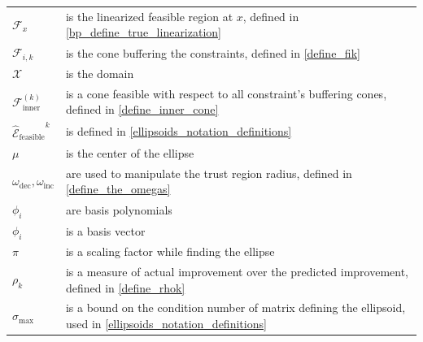 \documentclass{article}
\theoremstyle{case}
\numberwithin{theorem}{subsection}
\newcommand{\domain}{{\mathcal X}}
\newcommand{\fcki}{{\mathcal {F}^{(k)}_{\textrm{inner}}}}
\newcommand{\fik}{{\mathcal F_{i, k}}}
\newcommand{\omegadec}{\omega_{\text{dec}}}
\newcommand{\omegainc}{\omega_{\text{inc}}}
\newcommand{\rk}{\rho_k}
\newcommand{\scaledunshiftedellipsoid}{{{\mathcal {\hat E}_{\text{feasible}}}^k}}
\newcommand{\sigmamax}{{\sigma_{\textrm{max}}}}
\begin{document}
\begin{longtable}{| p{} | p{} |}
$\mathcal F_x$ & is the linearized feasible region at $x$, defined in \cref{bp_define_true_linearization} \\ %
$\fik $ & is the cone buffering the constraints, defined in \cref{define_fik} \\ %
$\domain$ & is the domain \\ %
$\fcki $ & is a cone feasible with respect to all constraint's buffering cones, defined in \cref{define_inner_cone} \\ %
$\scaledunshiftedellipsoid$ & is defined in \cref{ellipsoids_notation_definitions} \\ %
$\mu$ & is the center of the ellipse \\ %
$\omegadec, \omegainc$ & are used to manipulate the trust region radius, defined in \cref{define_the_omegas} \\ %
$\phi_i$ & are basis polynomials \\ %
$\phi_i$ & is a basis vector \\ %
$\pi$ & is a scaling factor while finding the ellipse \\ %
$\rk$ & is a measure of actual improvement over the predicted improvement, defined in \cref{define_rhok} \\ %
$\sigmamax$ & is a bound on the condition number of matrix defining the ellipsoid, used in \cref{ellipsoids_notation_definitions} \\ %

\end{longtable}
\end{document}
